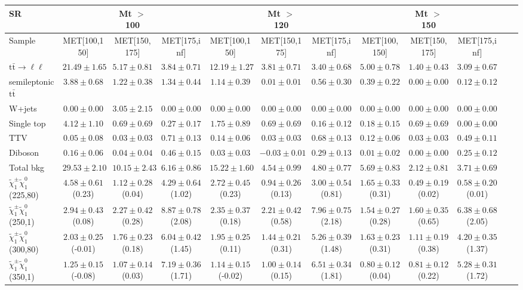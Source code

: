 \begin{table}
\begin{center}
\small
\begin{tabular}{lccccccccccc}
\hline
SR & & Mt $>$ 100 & & & Mt $>$ 120 & & &Mt $>$ 150 & & &\\
\hline
Sample&MET[100,150]&MET[150,175]&MET[175,inf]&MET[100,150]&MET[150,175]&MET[175,inf]&MET[100,150]&MET[150,175]&MET[175,inf]&\\
\hline
$\mathrm{t}\bar{\mathrm{t}}\rightarrow \ell\ell$&$21.49\pm1.65$&$5.17\pm0.81$&$3.84\pm0.71$&$12.19\pm1.27$&$3.81\pm0.71$&$3.40\pm0.68$&$5.00\pm0.78$&$1.40\pm0.43$&$3.09\pm0.67$\\
semileptonic $\mathrm{t}\bar{\mathrm{t}}$&$3.88\pm0.68$&$1.22\pm0.38$&$1.34\pm0.44$&$1.14\pm0.39$&$0.01\pm0.01$&$0.56\pm0.30$&$0.39\pm0.22$&$0.00\pm0.00$&$0.12\pm0.12$\\
W+jets&$0.00\pm0.00$&$3.05\pm2.15$&$0.00\pm0.00$&$0.00\pm0.00$&$0.00\pm0.00$&$0.00\pm0.00$&$0.00\pm0.00$&$0.00\pm0.00$&$0.00\pm0.00$\\
Single top&$4.12\pm1.10$&$0.69\pm0.69$&$0.27\pm0.17$&$1.75\pm0.89$&$0.69\pm0.69$&$0.16\pm0.12$&$0.18\pm0.15$&$0.69\pm0.69$&$0.00\pm0.00$\\
TTV&$0.05\pm0.08$&$0.03\pm0.03$&$0.71\pm0.13$&$0.14\pm0.06$&$0.03\pm0.03$&$0.68\pm0.13$&$0.12\pm0.06$&$0.03\pm0.03$&$0.49\pm0.11$\\
Diboson&$0.16\pm0.06$&$0.04\pm0.04$&$0.46\pm0.15$&$0.03\pm0.03$&$-0.03\pm0.01$&$0.29\pm0.13$&$0.01\pm0.02$&$0.00\pm0.00$&$0.25\pm0.12$\\
\hline
Total bkg&$29.53\pm2.10$&$10.15\pm2.43$&$6.16\pm0.86$&$15.22\pm1.60$&$4.54\pm0.99$&$4.80\pm0.77$&$5.69\pm0.83$&$2.12\pm0.81$&$3.71\pm0.69$\\
$\tilde{\chi}_{1}^{\pm}\tilde{\chi}_{1}^{0}$ (225,80)&$4.58\pm0.61$(0.23)&$1.12\pm0.28$(0.04)&$4.29\pm0.64$(1.02)&$2.72\pm0.45$(0.23)&$0.94\pm0.26$(0.13)&$3.00\pm0.54$(0.81)&$1.65\pm0.33$(0.31)&$0.49\pm0.19$(0.02)&$0.58\pm0.20$(0.01)\\
$\tilde{\chi}_{1}^{\pm}\tilde{\chi}_{1}^{0}$ (250,1)&$2.94\pm0.43$(0.08)&$2.27\pm0.42$(0.28)&$8.87\pm0.78$(2.08)&$2.35\pm0.37$(0.18)&$2.21\pm0.42$(0.58)&$7.96\pm0.75$(2.18)&$1.54\pm0.27$(0.28)&$1.60\pm0.35$(0.65)&$6.38\pm0.68$(2.05)\\
$\tilde{\chi}_{1}^{\pm}\tilde{\chi}_{1}^{0}$ (300,80)&$2.03\pm0.25$(-0.01)&$1.76\pm0.23$(0.18)&$6.04\pm0.42$(1.45)&$1.95\pm0.25$(0.11)&$1.44\pm0.21$(0.31)&$5.26\pm0.39$(1.48)&$1.63\pm0.23$(0.31)&$1.11\pm0.19$(0.38)&$4.20\pm0.35$(1.37)\\
$\tilde{\chi}_{1}^{\pm}\tilde{\chi}_{1}^{0}$ (350,1)&$1.25\pm0.15$(-0.08)&$1.07\pm0.14$(0.03)&$7.19\pm0.36$(1.71)&$1.14\pm0.15$(-0.02)&$1.00\pm0.14$(0.15)&$6.51\pm0.34$(1.81)&$0.80\pm0.12$(0.04)&$0.81\pm0.12$(0.22)&$5.28\pm0.31$(1.72)\\
\hline
\hline\hline
\end{tabular}
\end{center}
\end{table}
